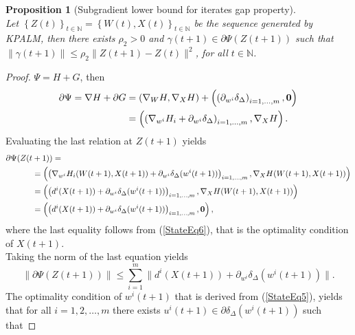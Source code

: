 \documentclass[11pt]{article}
\numberwithin{equation}{section}
\newtheorem{proposition}{Proposition}[section]
\begin{document}
\begin{proposition}[Subgradient lower bound for iterates gap property]\ \\
Let $\left\lbrace Z(t) \right\rbrace_{t \in \mathbb{N}} = \left\lbrace W(t) , X(t) \right\rbrace_{t \in \mathbb{N}}$ be the sequence generated by KPALM, then there exists $\rho_2 > 0$ and $\gamma(t+1) \in \partial \Psi(Z(t+1))$ such that $\| \gamma(t+1)\| \leq \rho_2 \|Z(t+1) - Z(t)\|^2$, for all $t \in \mathbb{N} $.
\end{proposition}

\begin{proof}
$\Psi = H + G$, then
\begin{equation*}
\begin{aligned}
	\partial \Psi = \nabla H + \partial G  
	& = \left( \nabla_{W}H, \nabla_{X}H \right) + \left( \left( \partial_{w^i}\delta_{\Delta} \right)_{i=1, \ldots ,m}, \bf{0} \right) \\
	& = \left( \left( \nabla_{w^i} H_i + \partial_{w^i} \delta_{\Delta} \right)_{i=1, \ldots ,m} , \nabla_X H \right) .
\end{aligned}
\end{equation*}
Evaluating the last relation at $Z(t+1)$ yields
\begin{equation*}
\begin{aligned}
	\partial \Psi(Z(t & + 1)) = \\
	& = \left( \left( \nabla_{w^i} H_i(W(t+1),X(t+1)) + \partial_{w^i} \delta_{\Delta}(w^i(t+1)) \right)_{i=1, \ldots ,m} , \nabla_X H(W(t+1),X(t+1)) \right) \\
	& = \left( \left( d^i(X(t+1)) + \partial_{w^i} \delta_{\Delta}(w^i(t+1)) \right)_{i=1, \ldots ,m} , \nabla_X H(W(t+1),X(t+1)) \right) \\
	& = \left( \left( d^i(X(t+1)) + \partial_{w^i} \delta_{\Delta}(w^i(t+1)) \right)_{i=1, \ldots ,m} , \bf{0} \right) ,
\end{aligned}
\end{equation*}
where the last equality follows from (\ref{StateEq6}), that is the optimality condition of $X(t+1)$. \\
Taking the norm of the last equation yields
\begin{equation}
	\| \partial \Psi(Z(t+1))\| 
	\leq \sum\limits_{i=1}^{m} \| d^i(X(t+1)) + \partial_{w^i} \delta_{\Delta}(w^i(t+1)) \|. \label{StateEq9}
\end{equation}
The optimality condition of $w^i(t+1)$ that is derived from (\ref{StateEq5}), yields that for all $i=1, 2, \ldots ,m$ there exists $u^i(t+1) \in \partial \delta_{\Delta}(w^i(t+1))$ such that

\end{proof}
\end{document}
